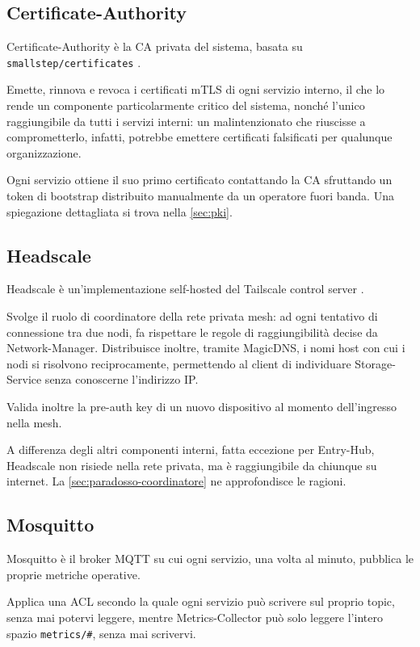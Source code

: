 \subsection{Certificate-Authority}

Certificate-Authority è la CA privata del sistema, basata su \texttt{smallstep/certificates}
\cite{smallstep-certificates-github}. 

Emette, rinnova e revoca i certificati mTLS di ogni servizio interno, il che lo rende un componente 
particolarmente critico del sistema, nonché l'unico raggiungibile da tutti i servizi interni: 
un malintenzionato che riuscisse a comprometterlo, infatti, potrebbe emettere certificati falsificati 
per qualunque organizzazione.

Ogni servizio ottiene il suo primo certificato contattando la CA sfruttando un token di bootstrap distribuito 
manualmente da un operatore fuori banda. Una spiegazione dettagliata si trova nella \autoref{sec:pki}.


\subsection{Headscale}

Headscale è un'implementazione self-hosted del Tailscale control server \cite{headscale-github}. 

Svolge il ruolo di coordinatore della rete privata mesh: ad ogni tentativo di connessione tra due nodi,
fa rispettare le regole di raggiungibilità decise da Network-Manager. Distribuisce inoltre, tramite
MagicDNS, i nomi host con cui i nodi si risolvono reciprocamente, permettendo al client di individuare
Storage-Service senza conoscerne l'indirizzo IP.

Valida inoltre la pre-auth key di un nuovo dispositivo al momento dell'ingresso nella mesh.

A differenza degli altri componenti interni, fatta eccezione per Entry-Hub, Headscale non risiede nella 
rete privata, ma è raggiungibile da chiunque su internet. La \autoref{sec:paradosso-coordinatore} ne approfondisce le ragioni.

\subsection{Mosquitto}

Mosquitto è il broker MQTT su cui ogni servizio, una volta al minuto, pubblica le proprie metriche operative. 

Applica una ACL secondo la quale ogni servizio può scrivere sul proprio topic, senza mai potervi leggere, 
mentre Metrics-Collector può solo leggere l'intero spazio \texttt{metrics/\#}, senza mai scrivervi.

